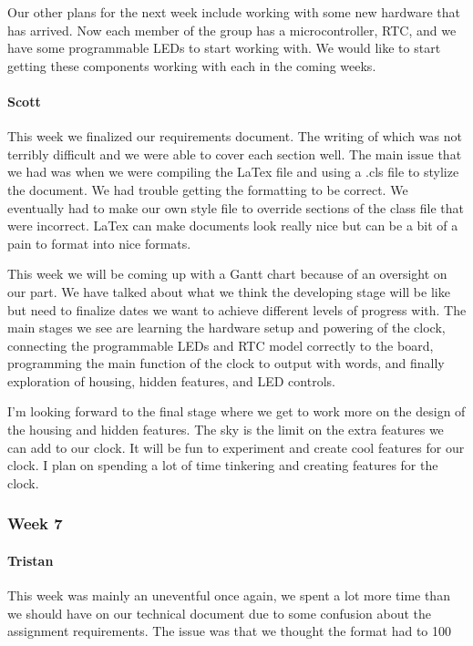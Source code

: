 \documentclass[onecolumn, draftclsnofoot,10pt, compsoc]{IEEEtran}
\begin{document}
Our other plans for the next week include working with some new hardware that has arrived. Now each member of the group has a microcontroller, RTC, and we have some programmable LEDs to start working with. We would like to start getting these components working with each in the coming weeks.
\paragraph{Scott}
This week we finalized our requirements document. The writing of which was not terribly difficult and we were able to cover each section well. The main issue that we had was when we were compiling the LaTex file and using a .cls file to stylize the document. We had trouble getting the formatting to be correct. We eventually had to make our own style file to override sections of the class file that were incorrect. LaTex can make documents look really nice but can be a bit of a pain to format into nice formats.

This week we will be coming up with a Gantt chart because of an oversight on our part. We have talked about what we think the developing stage will be like but need to finalize dates we want to achieve different levels of progress with. The main stages we see are learning the hardware setup and powering of the clock, connecting the programmable LEDs and RTC model correctly to the board, programming the main function of the clock to output with words, and finally exploration of housing, hidden features, and LED controls.

I'm looking forward to the final stage where we get to work more on the design of the housing and hidden features. The sky is the limit on the extra features we can add to our clock. It will be fun to experiment and create cool features for our clock. I plan on spending a lot of time tinkering and creating features for the clock.
\subsubsection{Week 7}
\paragraph{Tristan}
This week was mainly an uneventful once again, we spent a lot more time than we should have on our technical document due to some confusion about the assignment requirements. The issue was that we thought the format had to 100%
\end{document}
